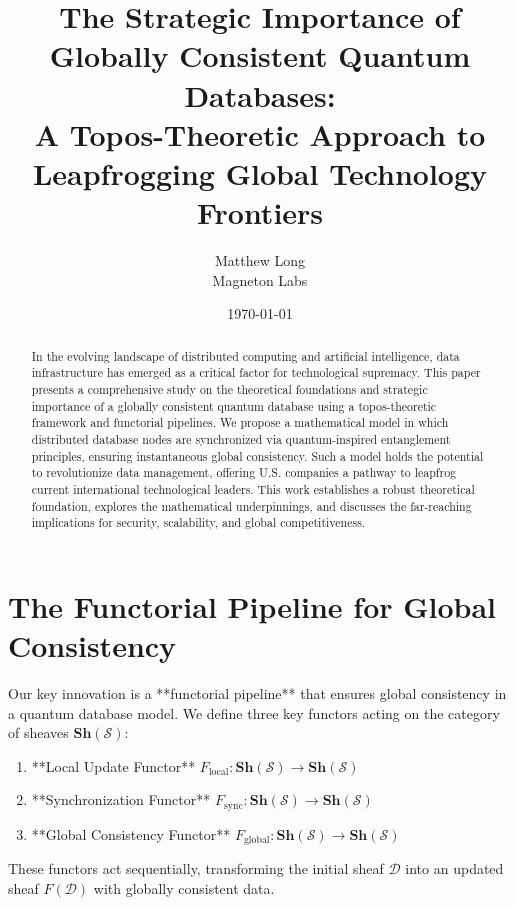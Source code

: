 \documentclass[11pt]{article}
\title{\textbf{The Strategic Importance of Globally Consistent Quantum Databases: \\ A Topos-Theoretic Approach to Leapfrogging Global Technology Frontiers}}
\author{Matthew Long \\ Magneton Labs}
\date{\today}
\theoremstyle{remark}
\begin{document}
\maketitle

\begin{abstract}
In the evolving landscape of distributed computing and artificial intelligence, data infrastructure has emerged as a critical factor for technological supremacy. This paper presents a comprehensive study on the theoretical foundations and strategic importance of a globally consistent quantum database using a topos-theoretic framework and functorial pipelines. We propose a mathematical model in which distributed database nodes are synchronized via quantum-inspired entanglement principles, ensuring instantaneous global consistency. Such a model holds the potential to revolutionize data management, offering U.S. companies a pathway to leapfrog current international technological leaders. This work establishes a robust theoretical foundation, explores the mathematical underpinnings, and discusses the far-reaching implications for security, scalability, and global competitiveness.
\end{abstract}

\tableofcontents
\newpage

\section{The Functorial Pipeline for Global Consistency}

Our key innovation is a **functorial pipeline** that ensures global consistency in a quantum database model. We define three key functors acting on the category of sheaves \( \mathbf{Sh}(\mathcal{S}) \):

\begin{enumerate}[label=(\alph*)]
    \item **Local Update Functor** \( F_{\text{local}}: \mathbf{Sh}(\mathcal{S}) \to \mathbf{Sh}(\mathcal{S}) \)
    \item **Synchronization Functor** \( F_{\text{sync}}: \mathbf{Sh}(\mathcal{S}) \to \mathbf{Sh}(\mathcal{S}) \)
    \item **Global Consistency Functor** \( F_{\text{global}}: \mathbf{Sh}(\mathcal{S}) \to \mathbf{Sh}(\mathcal{S}) \)
\end{enumerate}

These functors act sequentially, transforming the initial sheaf \( \mathcal{D} \) into an updated sheaf \( F(\mathcal{D}) \) with globally consistent data.
\end{document}
